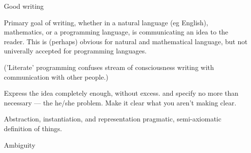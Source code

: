 \begin{plSection}{Good writing}

Primary goal of writing, whether in a natural language (eg
English), mathematics, or a programming language, is communicating
an idea to the reader.
This is (perhaps) obvious for natural and mathematical language,
but not univerally accepted for programming languages.

\cite{AbelsonSussman:1996:SICP,Halmos:1958:Finite,Halmos:1970:HowToWrite,Spivak:1965:CalculusOnManifolds}

('Literate' programming confuses stream of consciousness writing
with communication with other people.)

Express the idea completely enough, without excess.
and specify no more than
necessary --- the he/she problem.
Make it clear what you aren't making clear.
\begin{plSection}{Abstraction, instantiation, and representation}
pragmatic, semi-axiomatic definition of things.
\end{plSection}
\begin{plSection}{Ambiguity}
\end{plSection}
\end{plSection}

